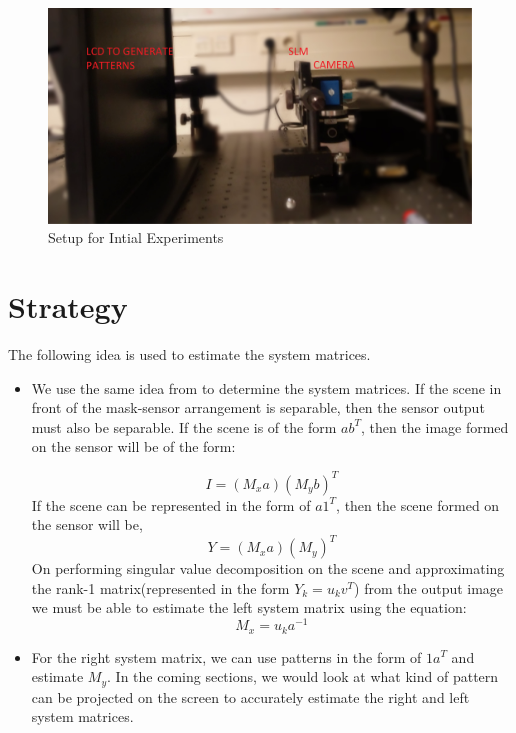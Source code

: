 \begin{figure}[h]
\centering
\includegraphics[width = \linewidth]{pics/experiment_lcd_new}
\caption{Setup for Intial Experiments}
\label{fig:experiment_lcd}
\end{figure}

\section{Strategy}
The following idea is used to estimate the system matrices.
\begin{itemize}

\item We use the same idea from \cite{Flatcam} to determine the system matrices. If the scene in front of the mask-sensor arrangement is separable, then the sensor output must also be separable. If the scene is of the form $ab^T$, then the image formed on the sensor will be of the form:

\begin{equation}
I = (M_xa)(M_yb)^T
\end{equation}
If the scene can be represented in the form of $a1^T$, then the scene formed on the sensor will be,
\begin{equation}
Y = (M_xa)(M_y)^T
\label{eq:separ_eq}
\end{equation}
On performing singular value decomposition on the scene and approximating the rank-1 matrix(represented in the form $Y_k = u_k v^T$) from the output image we must be able to estimate the left system matrix using the equation:
\begin{equation}
M_x = u_ka^{-1}
\end{equation}
\item For the right system matrix, we can use patterns in the form of $1a^T$ and estimate $M_y$. In the coming sections, we would look at what kind of pattern can be projected on the screen to accurately estimate the right and left system matrices. 
\end{itemize}
